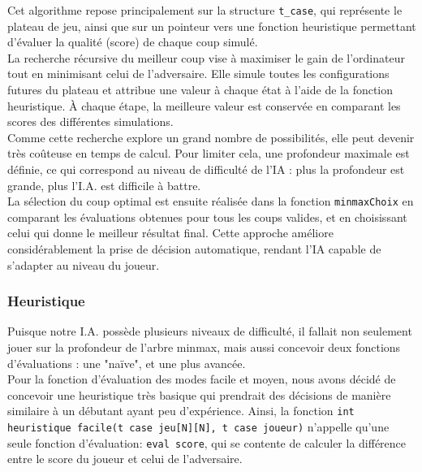 \documentclass[12pt, a4paper, oneside]{article}
\begin{document}
        Cet algorithme repose principalement sur la structure \texttt{t\_case}, qui représente le plateau de jeu, ainsi que sur un pointeur vers une fonction heuristique permettant d'évaluer la qualité (score) de chaque coup simulé. \\
        
        La recherche récursive du meilleur coup vise à maximiser le gain de l'ordinateur tout en minimisant celui de l'adversaire. Elle simule toutes les configurations futures du plateau et attribue une valeur à chaque état à l'aide de la fonction heuristique. À chaque étape, la meilleure valeur est conservée en comparant les scores des différentes simulations.\\
        
        Comme cette recherche explore un grand nombre de possibilités, elle peut devenir très coûteuse en temps de calcul. Pour limiter cela, une profondeur maximale est définie, ce qui correspond au niveau de difficulté de l'IA : plus la profondeur est grande, plus l'I.A. est difficile à battre.\\
        
        La sélection du coup optimal est ensuite réalisée dans la fonction \texttt{minmaxChoix} en comparant les évaluations obtenues pour tous les coups valides, et en choisissant celui qui donne le meilleur résultat final. Cette approche améliore considérablement la prise de décision automatique, rendant l'IA capable de s'adapter au niveau du joueur.

        \subsubsection{Heuristique}
        Puisque notre I.A. possède plusieurs niveaux de difficulté, il fallait non seulement jouer sur la profondeur de l'arbre minmax,
        mais aussi concevoir deux fonctions d'évaluations : une "naïve", et une plus avancée. \\

        Pour la fonction d'évaluation des modes facile et moyen, nous avons décidé de concevoir une heuristique très basique qui prendrait
        des décisions de manière similaire à un débutant ayant peu d'expérience. Ainsi, la fonction \texttt{int heuristique\textunderscore
        facile(t\textunderscore
        case jeu[N][N],
        t\textunderscore
        case joueur)} n'appelle qu'une seule fonction d'évaluation: \texttt{eval\textunderscore
        score}, qui se contente de calculer la différence entre le score du
        joueur et celui de l'adversaire. \\
\end{document}
